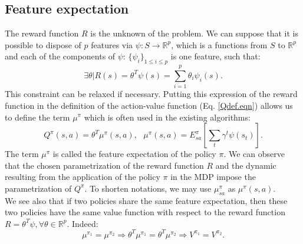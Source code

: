 \documentclass{article}
\begin{document}
\subsection{Feature expectation}
\label{ConsiderationsTechniques.sec}
The reward function $R$ is the unknown of the problem. We can suppose that it is possible to dispose of $p$ features via $\psi: S\rightarrow \mathbb{R}^p$, which is a functions from $S$ to $\mathbb{R}^p$ and each of the components of $\psi$: $\{\psi_i\}_{1\leq i \leq p}$ is one feature, such that:
\begin{equation}
\label{hatRdef.eqn}
\exists \theta | R(s) = \theta^T\psi(s) = \sum_{i=1}^p\theta_i\psi_i(s).
\end{equation}
This constraint can be relaxed if necessary. Putting this expression of the reward function in the definition of the action-value function (Eq. \eqref{Qdef.eqn}) allows us to define the term $\mu^\pi$ which is often used in the existing algorithms:
\begin{equation}
Q^\pi(s,a)=\theta^T\mu^\pi(s,a),\text{ }\mu^\pi(s,a) = E^\pi_{sa}[\sum_t\gamma^t\psi(s_t)].
\label{Qmu.eqn}
\end{equation}
The term $\mu^\pi$ is called the feature expectation of the policy $\pi$. We can observe that the chosen parametrization of the reward function $R$ and the dynamic resulting from the application of the policy $\pi$ in the MDP impose the parametrization of $Q^\pi$. To shorten notations, we may use $\mu^\pi_{sa}$ as $\mu^\pi(s,a)$.\\
We see also that if two policies share the same feature expectation, then these two policies have the same value function with respect to the reward function $R=\theta^T\psi,\forall \theta\in\mathbb{R}^p$. Indeed: \begin{equation}
\mu^{\pi_1} = \mu^{\pi_2} \Rightarrow \theta^T\mu^{\pi_1} = \theta^T\mu^{\pi_2} \Rightarrow V^{\pi_1} = V^{\pi_2}.
\label{memevaleur.eqn}
\end{equation}
\end{document}
